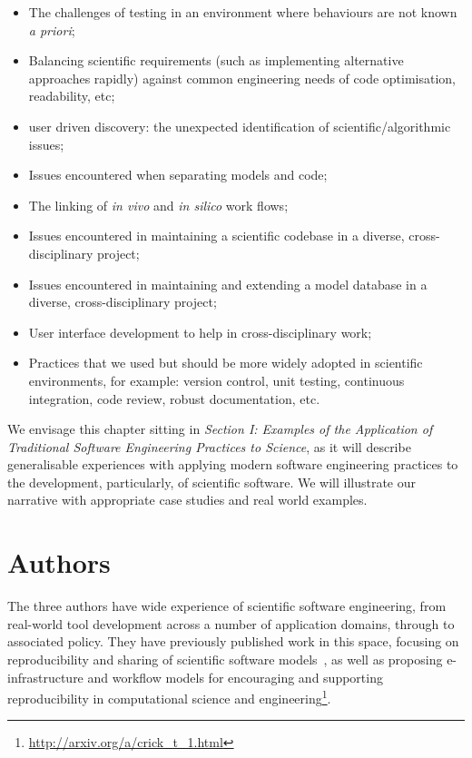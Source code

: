 \documentclass[a4paper,11pt]{article}
\begin{document}
\begin{itemize}
\item The challenges of testing in an environment where behaviours 
	are not known \emph{a priori}; 
\item Balancing scientific requirements (such as implementing alternative 
	approaches rapidly) against common engineering needs of code optimisation, 
	readability, etc; 
\item user driven discovery: the unexpected identification of 
	scientific/algorithmic issues;
\item Issues encountered when separating models and code; 
\item The linking of {\em in vivo} and {\em in silico} work flows;
\item Issues encountered in maintaining a scientific codebase in a diverse, 
cross-disciplinary project; 
\item Issues encountered in maintaining and extending a model database in a diverse, cross-disciplinary project;
\item User interface development to help in cross-disciplinary work;
\item Practices that we used but should be more widely adopted in
  scientific environments, for example: version control, unit testing,
  continuous integration, code review, robust documentation, etc. 
\end{itemize}

We envisage this chapter sitting in {\emph{Section I: Examples of the
Application of Traditional Software Engineering Practices to
Science}}, as it will describe generalisable experiences with applying
modern software engineering practices to the development,
particularly, of scientific software. We will illustrate our narrative
with appropriate case studies and real world examples.

\section*{Authors}

The three authors have wide experience of scientific software
engineering, from real-world tool development across a number of
application domains, through to associated policy. They have
previously published work in this space, focusing on reproducibility
and sharing of scientific software
models~\cite{crick-et-al_wssspe2,crick-et-al_recomp2014}, as well as
proposing e-infrastructure and workflow models for encouraging and
supporting reproducibility in computational science and
engineering\footnote{\url{http://arxiv.org/a/crick_t_1.html}}.
\end{document}
